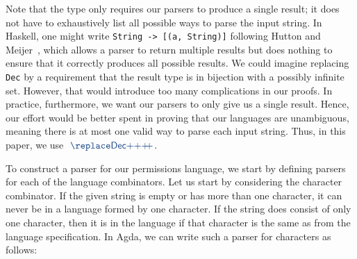 \begin{remark}
Note that the  type only requires our parsers to produce a single
result; it does not have to exhaustively list all possible ways to parse the
input string. In Haskell, one might write \verb|String -> [(a, String)]| following Hutton and Meijer~\cite{monadic-parsing}, which allows a parser to return
multiple results but does nothing to ensure that it correctly produces all
possible results.
We could imagine replacing \verb|Dec| by a requirement that the result type is
in bijection with a possibly infinite set.
However, that would introduce too many complications in our proofs.
In practice, furthermore, we want our parsers
to only give us a single result. Hence, our effort would be better spent in
proving that our languages are unambiguous, meaning there is at most one valid
way to parse each input string. Thus, in this paper, we use
$\af{Dec}$.
\end{remark}

To construct a parser for our permissions language, we start by defining parsers for each of the language combinators. Let us start by considering the character combinator. If the given string is empty or has more than one character, it can never be in a language formed by one character. If the string does consist of only one character, then it is in the language if that character is the same as from the language specification. In Agda, we can write such a parser for characters as follows:

